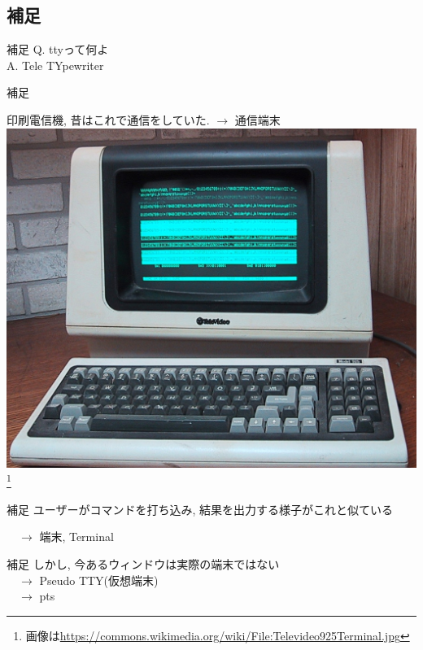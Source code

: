 \documentclass[uplatex, dvipdfmx, unicode]{beamer}
\begin{document}
\subsection{補足}
\begin{frame}{補足}
  Q. ttyって何よ \\
  A. \alert{T}ele \alert{TY}pewriter
\end{frame}

\begin{frame}{補足}
  
  印刷電信機, 昔はこれで通信をしていた. $\rightarrow$ 通信端末
  {
    \centering
    \includegraphics[keepaspectratio, scale=.18]{./img/tty.jpg} \\
  }
  \footnote*{\scriptsize 画像は\url{https://commons.wikimedia.org/wiki/File:Televideo925Terminal.jpg}}
\end{frame}

\begin{frame}{補足}
  ユーザーがコマンドを打ち込み, 結果を出力する様子がこれと似ている

  \ \ $\rightarrow$ 端末, Terminal
\end{frame}

\begin{frame}{補足}
  しかし, 今あるウィンドウは実際の端末ではない\\
  \ \ $\rightarrow$ Pseudo TTY(仮想端末) \\
  \ \ $\rightarrow$ pts
\end{frame}
\end{document}
